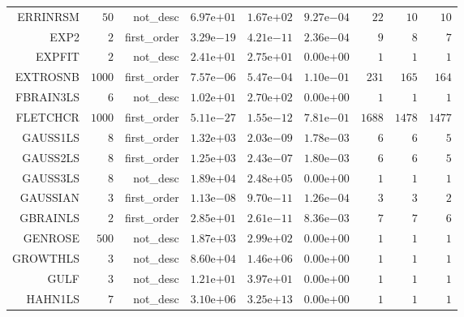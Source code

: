 \begin{longtable}{rrrrrrrrr}
ERRINRSM & \(    50\) & not\_desc & \( 6.97\)e\(+01\) & \( 1.67\)e\(+02\) & \( 9.27\)e\(-04\) & \(    22\) & \(    10\) & \(    10\) \\
EXP2 & \(     2\) & first\_order & \( 3.29\)e\(-19\) & \( 4.21\)e\(-11\) & \( 2.36\)e\(-04\) & \(     9\) & \(     8\) & \(     7\) \\
EXPFIT & \(     2\) & not\_desc & \( 2.41\)e\(+01\) & \( 2.75\)e\(+01\) & \( 0.00\)e\(+00\) & \(     1\) & \(     1\) & \(     1\) \\
EXTROSNB & \(  1000\) & first\_order & \( 7.57\)e\(-06\) & \( 5.47\)e\(-04\) & \( 1.10\)e\(-01\) & \(   231\) & \(   165\) & \(   164\) \\
FBRAIN3LS & \(     6\) & not\_desc & \( 1.02\)e\(+01\) & \( 2.70\)e\(+02\) & \( 0.00\)e\(+00\) & \(     1\) & \(     1\) & \(     1\) \\
FLETCHCR & \(  1000\) & first\_order & \( 5.11\)e\(-27\) & \( 1.55\)e\(-12\) & \( 7.81\)e\(-01\) & \(  1688\) & \(  1478\) & \(  1477\) \\
GAUSS1LS & \(     8\) & first\_order & \( 1.32\)e\(+03\) & \( 2.03\)e\(-09\) & \( 1.78\)e\(-03\) & \(     6\) & \(     6\) & \(     5\) \\
GAUSS2LS & \(     8\) & first\_order & \( 1.25\)e\(+03\) & \( 2.43\)e\(-07\) & \( 1.80\)e\(-03\) & \(     6\) & \(     6\) & \(     5\) \\
GAUSS3LS & \(     8\) & not\_desc & \( 1.89\)e\(+04\) & \( 2.48\)e\(+05\) & \( 0.00\)e\(+00\) & \(     1\) & \(     1\) & \(     1\) \\
GAUSSIAN & \(     3\) & first\_order & \( 1.13\)e\(-08\) & \( 9.70\)e\(-11\) & \( 1.26\)e\(-04\) & \(     3\) & \(     3\) & \(     2\) \\
GBRAINLS & \(     2\) & first\_order & \( 2.85\)e\(+01\) & \( 2.61\)e\(-11\) & \( 8.36\)e\(-03\) & \(     7\) & \(     7\) & \(     6\) \\
GENROSE & \(   500\) & not\_desc & \( 1.87\)e\(+03\) & \( 2.99\)e\(+02\) & \( 0.00\)e\(+00\) & \(     1\) & \(     1\) & \(     1\) \\
GROWTHLS & \(     3\) & not\_desc & \( 8.60\)e\(+04\) & \( 1.46\)e\(+06\) & \( 0.00\)e\(+00\) & \(     1\) & \(     1\) & \(     1\) \\
GULF & \(     3\) & not\_desc & \( 1.21\)e\(+01\) & \( 3.97\)e\(+01\) & \( 0.00\)e\(+00\) & \(     1\) & \(     1\) & \(     1\) \\
HAHN1LS & \(     7\) & not\_desc & \( 3.10\)e\(+06\) & \( 3.25\)e\(+13\) & \( 0.00\)e\(+00\) & \(     1\) & \(     1\) & \(     1\) \\

\end{longtable}
